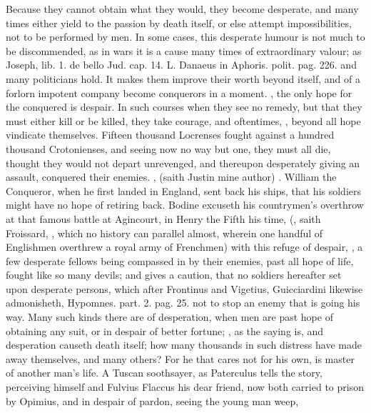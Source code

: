 {Because they cannot obtain what they would, they become desperate, and
many times either yield to the passion by death itself, or else attempt
impossibilities, not to be performed by men. In some cases, this
desperate humour is not much to be discommended, as in wars it is a
cause many times of extraordinary valour; as Joseph, \textlatin{lib. 1. de bello
Jud. cap. 14.} L. Danaeus in \textlatin{Aphoris. polit. pag. 226.} and many
politicians hold. It makes them improve their worth beyond itself, and
of a forlorn impotent company become conquerors in a moment. , the only hope for the conquered is
despair. In such courses when they see no remedy, but that they must
either kill or be killed, they take courage, and oftentimes, , beyond all hope vindicate themselves. Fifteen thousand Locrenses
fought against a hundred thousand Crotonienses, and seeing now no way
but one, they must all die, thought they would not depart
unrevenged, and thereupon desperately giving an assault, conquered
their enemies. , (saith Justin mine author)
. William the Conqueror, when he first landed in
England, sent back his ships, that his soldiers might have no hope of
retiring back. Bodine excuseth his countrymen's overthrow at that
famous battle at Agincourt, in Henry the Fifth his time, (,
saith Froissard, , which no history
can parallel almost, wherein one handful of Englishmen overthrew a
royal army of Frenchmen) with this refuge of despair, ,
a few desperate fellows being compassed in by their enemies, past all
hope of life, fought like so many devils; and gives a caution, that no
soldiers hereafter set upon desperate persons, which after
Frontinus and Vigetius, Guicciardini likewise admonisheth, \textlatin{Hypomnes.
part. 2. pag. 25.} not to stop an enemy that is going his way. Many such
kinds there are of desperation, when men are past hope of obtaining any
suit, or in despair of better fortune; , as
the saying is, and desperation causeth death itself; how many thousands
in such distress have made away themselves, and many others? For he
that cares not for his own, is master of another man's life. A Tuscan
soothsayer, as Paterculus tells the story, perceiving himself and
Fulvius Flaccus his dear friend, now both carried to prison by Opimius,
and in despair of pardon, seeing the young man weep, }
